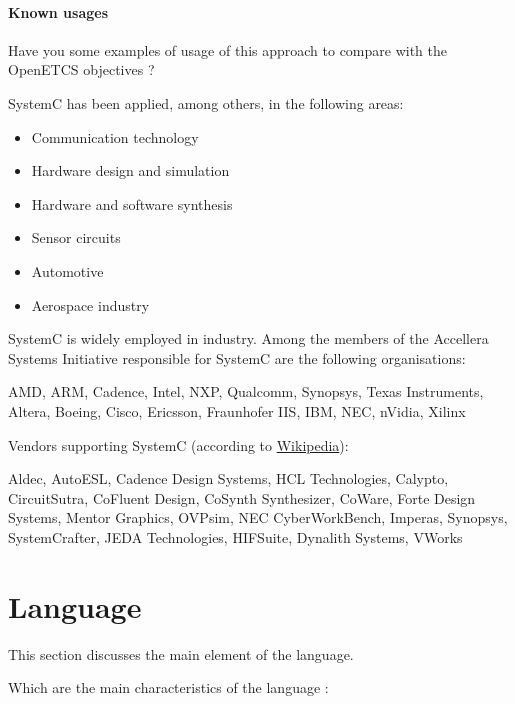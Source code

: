 \paragraph{Known usages} Have you some examples of usage of this approach to compare with the OpenETCS objectives ?

SystemC has been applied, among others, in the following areas:

\begin{itemize}
\item Communication technology
\item Hardware design and simulation
\item Hardware and software synthesis
\item Sensor circuits
\item Automotive
\item Aerospace industry
\end{itemize}

SystemC is widely employed in industry. Among the members of the Accellera Systems Initiative responsible for SystemC are the following organisations:

AMD, ARM, Cadence, Intel, NXP, Qualcomm, Synopsys, Texas Instruments, Altera, Boeing, Cisco, Ericsson, Fraunhofer IIS, IBM, NEC, nVidia, Xilinx

Vendors supporting SystemC (according to \href{http://en.wikipedia.org/wiki/SystemC}{Wikipedia}):

Aldec, AutoESL, Cadence Design Systems, HCL Technologies, Calypto, CircuitSutra, CoFluent Design, CoSynth Synthesizer, CoWare, Forte Design Systems, Mentor Graphics, OVPsim, NEC CyberWorkBench, Imperas, Synopsys, SystemCrafter, JEDA Technologies, HIFSuite, Dynalith Systems, VWorks


\section{Language}
This section discusses the main element of the language.

Which are the main characteristics of the language :

